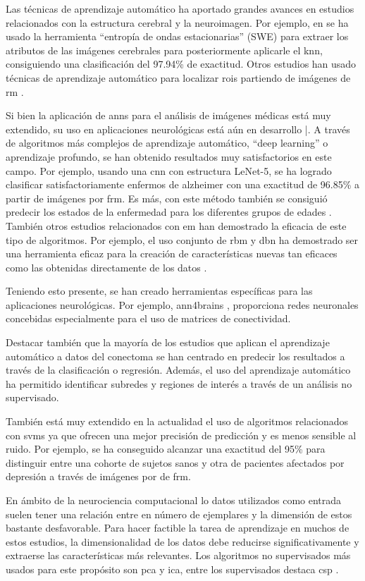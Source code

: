 Las técnicas de aprendizaje automático ha aportado grandes avances en estudios relacionados con la estructura cerebral y la neuroimagen. Por ejemplo, en \cite{Zhang2016ComparisonMachine} se ha usado la herramienta ``entropía de ondas estacionarias'' (SWE) para extraer los atributos de las imágenes cerebrales para posteriormente aplicarle el \gls{knn}, consiguiendo una clasificación del 97.94\% de exactitud. Otros estudios han usado técnicas de aprendizaje automático para localizar \glspl{roi} partiendo de imágenes de \gls{rm} \cite{Desikan2006AnInterest}.


Si bien la aplicación de \glspl{ann} para el análisis de imágenes médicas está muy extendido, su uso en aplicaciones neurológicas está aún en desarrollo \cite{Ciresan2013MitosisNetworks}|\cite{Ciresan2012DeepImages}. A través de algoritmos más complejos de aprendizaje automático, ``deep learning'' o aprendizaje profundo, se han obtenido resultados muy satisfactorios en este campo. Por ejemplo, usando una \gls{cnn} con estructura LeNet-5, se ha logrado clasificar  satisfactoriamente enfermos de alzheimer con una exactitud de 96.85\% a partir de imágenes por \gls{frm}. Es más, con este método también se consiguió predecir los estados de la enfermedad para los diferentes grupos de edades \cite{Sarraf2016ClassificationNetworks}. También otros estudios relacionados con \gls{em} han demostrado la eficacia de este tipo de algoritmos. Por ejemplo, el uso conjunto de \gls{rbm} y \gls{dbn}  ha demostrado ser una herramienta eficaz para la creación de características nuevas tan eficaces como las obtenidas directamente de los datos \cite{Yoo2014DeepSegmentation}.


Teniendo esto presente, se han creado herramientas específicas para las aplicaciones neurológicas. Por ejemplo, ann4brains \cite{Kawahara2017BrainNetCNN:Neurodevelopment}, proporciona redes neuronales concebidas especialmente para el uso de matrices de conectividad. 

Destacar también que la mayoría de los estudios que aplican el aprendizaje automático a datos del conectoma se han centrado en predecir los resultados a través de la clasificación o regresión. Además, el uso del aprendizaje automático ha permitido identificar subredes y regiones de interés a través de un análisis no supervisado.

También está muy extendido en la actualidad el uso de algoritmos relacionados con \glspl{svm} \cite{HamarnehsGroup} ya que ofrecen una mejor precisión de predicción y es menos sensible al ruido. Por ejemplo, \cite{Craddock2009DiseaseConnectivity} se ha conseguido alcanzar una exactitud del 95\% para distinguir entre una cohorte de sujetos sanos y otra de pacientes afectados por depresión a través de imágenes por de \gls{frm}.

En ámbito de la neurociencia computacional lo datos utilizados como entrada suelen tener una relación entre en número de ejemplares y la dimensión de estos bastante desfavorable. Para hacer factible la tarea de aprendizaje en muchos de estos estudios, la dimensionalidad de los datos debe reducirse significativamente y extraerse las características más relevantes. Los algoritmos no supervisados más usados para este propósito son \gls{pca} y \gls{ica}, entre los supervisados destaca \gls{csp} \cite{Lemm2011IntroductionImaging}.
